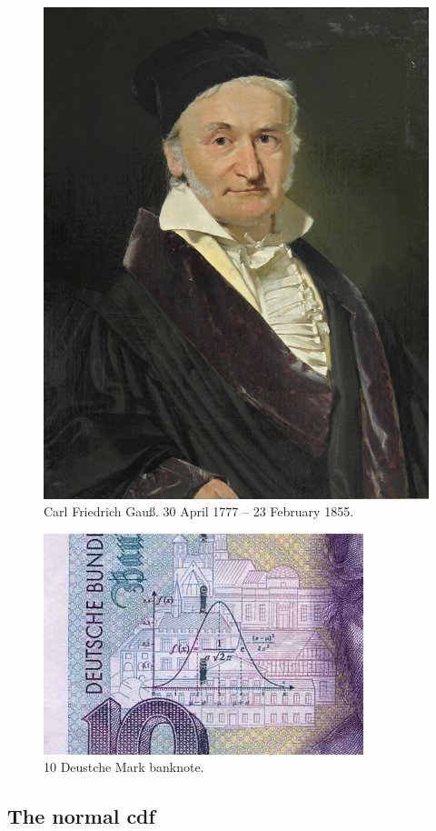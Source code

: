 \documentclass[
]{book}
\theoremstyle{definition}
\theoremstyle{definition}
\theoremstyle{definition}
\theoremstyle{definition}
\theoremstyle{remark}
\begin{document}
\begin{figure}

{\centering \includegraphics[width=0.6\linewidth]{figure/gauss} 

}

\caption{Carl Friedrich Gauß. 30 April 1777 -- 23 February 1855.}\label{fig:gauss}
\end{figure}

\begin{figure}

{\centering \includegraphics[width=0.6\linewidth]{figure/deutschemark} 

}

\caption{10 Deustche Mark banknote.}\label{fig:deutschemark}
\end{figure}

\hypertarget{the-normal-cdf}{%
\subsection{The normal cdf}\label{the-normal-cdf}}
\end{document}
